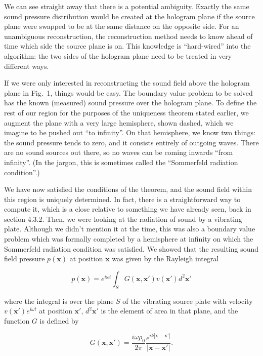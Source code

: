   We can see straight away that there is a potential ambiguity. Exactly the 
  same sound pressure distribution would be created at the hologram plane if 
  the source plane were swapped to be at the same distance on the opposite 
  side. For an unambiguous reconstruction, the reconstruction method needs to 
  know ahead of time which side the source plane is on. This knowledge is 
  ``hard-wired'' into the algorithm: the two sides of the hologram plane need 
  to be treated in very different ways. 

  If we were only interested in reconstructing the sound field above the 
  hologram plane in Fig.\ 1, things would be easy. The boundary value problem 
  to be solved has the known (measured) sound pressure over the hologram plane. 
  To define the rest of our region for the purposes of the uniqueness theorem 
  stated earlier, we augment the plane with a very large hemisphere, shown 
  dashed, which we imagine to be pushed out ``to infinity''. On that 
  hemisphere, we know two things: the sound pressure tends to zero, and it 
  consists entirely of outgoing waves. There are no sound sources out there, so 
  no waves can be coming inwards ``from infinity''. (In the jargon, this is 
  sometimes called the ``Sommerfeld radiation condition''.) 

  We have now satisfied the conditions of the theorem, and the sound field 
  within this region is uniquely determined. In fact, there is a 
  straightforward way to compute it, which is a close relative to something we 
  have already seen, back in section 4.3.2. Then, we were looking at the 
  radiation of sound by a vibrating plate. Although we didn't mention it at the 
  time, this was also a boundary value problem which was formally completed by 
  a hemisphere at infinity on which the Sommerfeld radiation condition was 
  satisfied. We showed that the resulting sound field pressure $p(\mathbf{x})$ 
  at position $\mathbf{x}$ was given by the Rayleigh integral 

  $$p(\mathbf{x}) = e^{i \omega t} \int_S{G(\mathbf{x},\mathbf{x'}) 
  v(\mathbf{x'}) d^2 \mathbf{x'}} \tag{1}$$ 

  where the integral is over the plane $S$ of the vibrating source plate with 
  velocity $v(\mathbf{x'})e^{i \omega t}$ at position $\mathbf{x'}$, $d^2 
  \mathbf{x'}$ is the element of area in that plane, and the function $G$ is 
  defined by 

  $$G(\mathbf{x},\mathbf{x'})= \dfrac{i \omega \rho_0}{2 \pi}\dfrac{e^{i k 
  |\mathbf{x}-\mathbf{x'}|}}{|\mathbf{x}-\mathbf{x'}|} . \tag{2}$$ 

